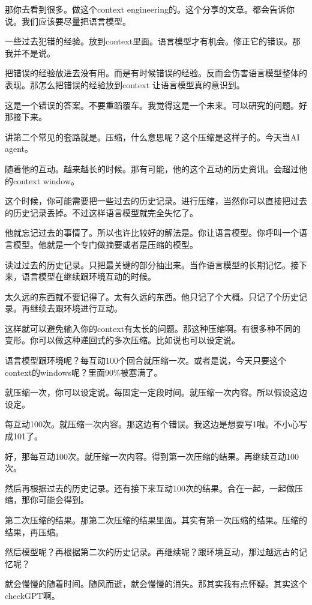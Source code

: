 \documentclass[12pt,a4paper]{article}
\begin{document}
那你去看到很多。做这个context engineering的。这个分享的文章。都会告诉你说。我们应该要尽量把语言模型。

一些过去犯错的经验。放到context里面。语言模型才有机会。修正它的错误。那我并不是说。

把错误的经验放进去没有用。而是有时候错误的经验。反而会伤害语言模型整体的表现。那怎么把错误的经验放到context 让语言模型真的意识到。

这是一个错误的答案。不要重蹈覆车。我觉得这是一个未来。可以研究的问题。好那接下来。

讲第二个常见的套路就是。压缩，什么意思呢？这个压缩是这样子的。今天当AI agent。

随着他的互动。越来越长的时候。那有可能，他的这个互动的历史资讯。会超过他的context window。

这个时候，你可能需要把一些过去的历史记录。进行压缩，当然你可以直接把过去的历史记录丢掉。不过这样语言模型就完全失忆了。

他就忘记过去的事情了。所以也许比较好的解法是。你让语言模型。你呼叫一个语言模型。他就是一个专门做摘要或者是压缩的模型。

读过过去的历史记录。只把最关键的部分抽出来。当作语言模型的长期记忆。接下来，语言模型在继续跟环境互动的时候。

太久远的东西就不要记得了。太有久远的东西。他只记了个大概。只记了个历史记录。再继续去跟环境进行互动。

这样就可以避免输入你的context有太长的问题。那这种压缩啊。有很多种不同的变形。你可以做这种递回式的多次压缩。比如说也可以设定说。

语言模型跟环境呢？每互动100个回合就压缩一次。或者是说，今天只要这个context的windows呢？里面90\%被塞满了。

就压缩一次，你可以设定说。每固定一定段时间。就压缩一次内容。所以假设这边设定。

每互动100次。就压缩一次内容。那这边有个错误。我这边是想要写1啦。不小心写成101了。

好，那每互动100次。就压缩一次内容。得到第一次压缩的结果。再继续互动100次。

然后再根据过去的历史记录。还有接下来互动100次的结果。合在一起，一起做压缩，那你可能会得到。

第二次压缩的结果。那第二次压缩的结果里面。其实有第一次压缩的结果。压缩的结果，再压缩。

然后模型呢？再根据第二次的历史记录。再继续呢？跟环境互动，那过越远古的记忆呢？

就会慢慢的随着时间。随风而逝，就会慢慢的消失。那其实我有点怀疑。其实这个checkGPT啊。
\end{document}
